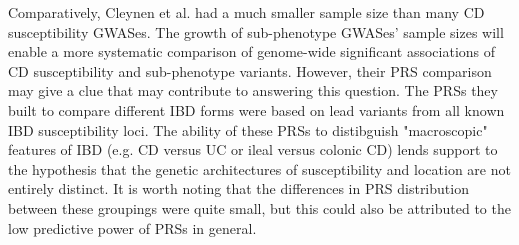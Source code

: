 Comparatively, Cleynen et al. had a much smaller sample size than many CD susceptibility GWASes. The growth of sub-phenotype GWASes' sample sizes will enable a more systematic comparison of genome-wide significant associations of CD susceptibility and sub-phenotype variants. However, their PRS comparison may give a clue that may contribute to answering this question. The PRSs they built to compare different IBD forms were based on lead variants from all known IBD susceptibility loci. The ability of these PRSs to distibguish "macroscopic" features of IBD (e.g. CD versus UC or ileal versus colonic CD) lends support to the hypothesis that the genetic architectures of susceptibility and location are not entirely distinct. It is worth noting that the differences in PRS distribution between these groupings were quite small, but this could also be attributed to the low predictive power of PRSs in general.\\

